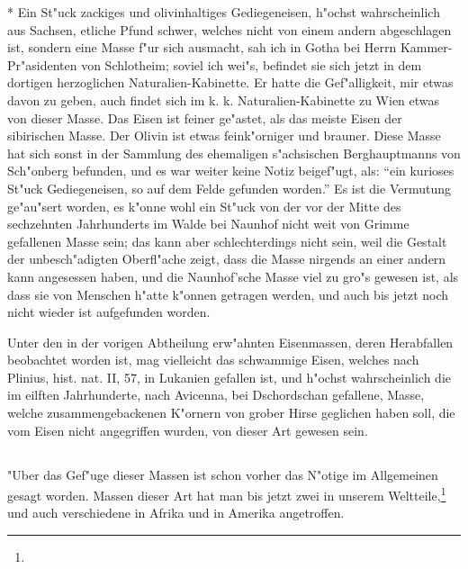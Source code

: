 \documentclass[a4paper, 11pt, oneside, polutonikogreek, german]{article}
\begin{document}
* Ein St"uck zackiges und olivinhaltiges Gediegeneisen, h"ochst wahrscheinlich aus Sachsen, etliche Pfund schwer, welches nicht von einem andern abgeschlagen ist, sondern eine Masse f"ur sich ausmacht, sah ich in Gotha bei Herrn Kammer-Pr"asidenten von Schlotheim; soviel ich wei"s, befindet sie sich jetzt in dem dortigen herzoglichen Naturalien-Kabinette. Er hatte die Gef"alligkeit, mir etwas davon zu geben, auch findet sich im k. k. Naturalien-Kabinette zu Wien etwas von dieser Masse. Das Eisen ist feiner ge"astet, als das meiste Eisen der sibirischen Masse. Der Olivin ist etwas feink"orniger und brauner. Diese Masse hat sich sonst in der Sammlung des ehemaligen s"achsischen Berghauptmanns von Sch"onberg befunden, und es war weiter keine Notiz beigef"ugt, als: "`ein kurioses St"uck Gediegeneisen, so auf dem Felde gefunden worden."' Es ist die Vermutung ge"au"sert worden, es k"onne wohl ein St"uck von der vor der Mitte des sechzehnten Jahrhunderts im Walde bei Naunhof nicht weit von Grimme gefallenen Masse sein; das kann aber schlechterdings nicht sein, weil die Gestalt der unbesch"adigten Oberfl"ache zeigt, dass die Masse nirgends an einer andern kann angesessen haben, und die Naunhof'sche Masse viel zu gro"s gewesen ist, als dass sie von Menschen h"atte k"onnen getragen werden, und auch bis jetzt noch nicht wieder ist aufgefunden worden.

Unter den in der vorigen Abtheilung erw"ahnten Eisenmassen, deren Herabfallen beobachtet worden ist, mag vielleicht das schwammige Eisen, welches nach Plinius, hist. nat. II, 57, in Lukanien gefallen ist, und h"ochst wahrscheinlich die im eilften Jahrhunderte, nach Avicenna, bei Dschordschan gefallene, Masse, welche zusammengebackenen K"ornern von grober Hirse geglichen haben soll, die vom Eisen nicht angegriffen wurden, von dieser Art gewesen sein.
\subsection{}
\paragraph{}
"Uber das Gef"uge dieser Massen ist schon vorher das N"otige im Allgemeinen gesagt worden. Massen dieser Art hat man bis jetzt zwei in unserem Weltteile,\footnote{} und auch verschiedene in Afrika und in Amerika angetroffen.
\end{document}
